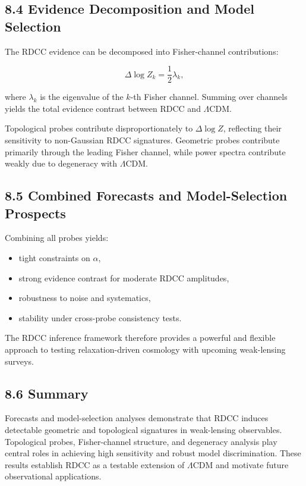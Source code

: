 \documentclass[11pt,a4paper]{article}
\begin{document}
\subsection*{8.4 Evidence Decomposition and Model Selection}

The RDCC evidence can be decomposed into Fisher-channel contributions:


\[
    \Delta \log Z_{k}
    =
    \frac{1}{2} \lambda_{k},
\]


where $\lambda_{k}$ is the eigenvalue of the $k$-th Fisher channel. Summing over 
channels yields the total evidence contrast between RDCC and $\Lambda$CDM.

Topological probes contribute disproportionately to $\Delta \log Z$, reflecting 
their sensitivity to non-Gaussian RDCC signatures. Geometric probes contribute 
primarily through the leading Fisher channel, while power spectra contribute 
weakly due to degeneracy with $\Lambda$CDM.

\subsection*{8.5 Combined Forecasts and Model-Selection Prospects}

Combining all probes yields:

\begin{itemize}
    \item tight constraints on $\alpha$,
    \item strong evidence contrast for moderate RDCC amplitudes,
    \item robustness to noise and systematics,
    \item stability under cross-probe consistency tests.
\end{itemize}

The RDCC inference framework therefore provides a powerful and flexible 
approach to testing relaxation-driven cosmology with upcoming weak-lensing 
surveys.

\subsection*{8.6 Summary}

Forecasts and model-selection analyses demonstrate that RDCC induces 
detectable geometric and topological signatures in weak-lensing observables. 
Topological probes, Fisher-channel structure, and degeneracy analysis play 
central roles in achieving high sensitivity and robust model discrimination. 
These results establish RDCC as a testable extension of $\Lambda$CDM and 
motivate future observational applications.
\end{document}
